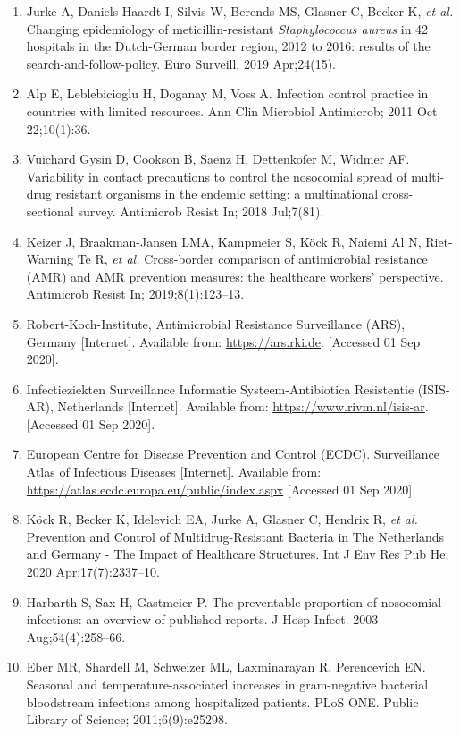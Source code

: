 \documentclass[
]{book}
\begin{document}
\begin{enumerate}
\item
  Jurke A, Daniels-Haardt I, Silvis W, Berends MS, Glasner C, Becker K, \emph{et al.} Changing epidemiology of meticillin-resistant \emph{Staphylococcus aureus} in 42 hospitals in the Dutch-German border region, 2012 to 2016: results of the search-and-follow-policy. Euro Surveill. 2019 Apr;24(15).
\item
  Alp E, Leblebicioglu H, Doganay M, Voss A. Infection control practice in countries with limited resources. Ann Clin Microbiol Antimicrob; 2011 Oct 22;10(1):36.
\item
  Vuichard Gysin D, Cookson B, Saenz H, Dettenkofer M, Widmer AF. Variability in contact precautions to control the nosocomial spread of multi-drug resistant organisms in the endemic setting: a multinational cross-sectional survey. Antimicrob Resist In; 2018 Jul;7(81).
\item
  Keizer J, Braakman-Jansen LMA, Kampmeier S, Köck R, Naiemi Al N, Riet-Warning Te R, \emph{et al.} Cross-border comparison of antimicrobial resistance (AMR) and AMR prevention measures: the healthcare workers' perspective. Antimicrob Resist In; 2019;8(1):123--13.
\item
  Robert-Koch-Institute, Antimicrobial Resistance Surveillance (ARS), Germany {[}Internet{]}. Available from: \url{https://ars.rki.de}. {[}Accessed 01 Sep 2020{]}.
\item
  Infectieziekten Surveillance Informatie Systeem-Antibiotica Resistentie (ISIS-AR), Netherlands {[}Internet{]}. Available from: \url{https://www.rivm.nl/isis-ar}. {[}Accessed 01 Sep 2020{]}.
\item
  European Centre for Disease Prevention and Control (ECDC). Surveillance Atlas of Infectious Diseases {[}Internet{]}. Available from: \url{https://atlas.ecdc.europa.eu/public/index.aspx} {[}Accessed 01 Sep 2020{]}.
\item
  Köck R, Becker K, Idelevich EA, Jurke A, Glasner C, Hendrix R, \emph{et al.} Prevention and Control of Multidrug-Resistant Bacteria in The Netherlands and Germany - The Impact of Healthcare Structures. Int J Env Res Pub He; 2020 Apr;17(7):2337--10.
\item
  Harbarth S, Sax H, Gastmeier P. The preventable proportion of nosocomial infections: an overview of published reports. J Hosp Infect. 2003 Aug;54(4):258--66.
\item
  Eber MR, Shardell M, Schweizer ML, Laxminarayan R, Perencevich EN. Seasonal and temperature-associated increases in gram-negative bacterial bloodstream infections among hospitalized patients. PLoS ONE. Public Library of Science; 2011;6(9):e25298.
\end{enumerate}
\end{document}
